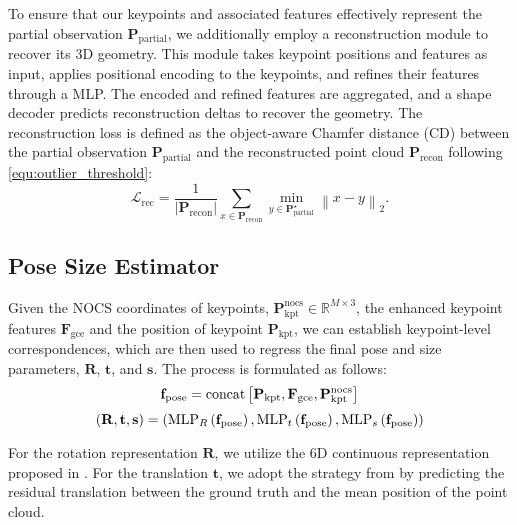 To ensure that our keypoints and associated features effectively represent the partial observation \( \mathbf{P}_{\text{partial}} \), we additionally employ a reconstruction module to recover its 3D geometry. This module takes keypoint positions and features as input, applies positional encoding to the keypoints, and refines their features through a MLP. The encoded and refined features are aggregated, and a shape decoder predicts reconstruction deltas to recover the geometry. The reconstruction loss is defined as the object-aware Chamfer distance (CD) between the partial observation \( \mathbf{P}_{\text{partial}} \) and the reconstructed point cloud \( \mathbf{P}_{\text{recon}} \) following \cref{equ:outlier_threshold}:
\begin{equation}
\mathcal{L}_{\text{rec}}=\frac{1}{\left|\mathbf{P}_{\text{recon}}\right|} \sum_{x \in \mathbf{P}_{\text{recon}}} \min _{y \in \mathbf{P}_{\text{partial}}^{\star}}\left\|x-y\right\|_2 .
\label{equ:loss_rec}
\end{equation}

\subsection{Pose Size Estimator} \label{subsec:pse}
Given the NOCS coordinates of keypoints, \(\mathbf{P}_{\text{kpt}}^{\text{nocs}} \in \mathbb{R}^{M \times 3}\), the enhanced keypoint features \(\mathbf{F}_{\text{gce}}\) and the position of keypoint $\mathbf{P}_{\text{kpt}}$, we can establish keypoint-level correspondences, which are then used to regress the final pose and size parameters, \(\mathbf{R}\), \(\mathbf{t}\), and \(\mathbf{s}\). The process is formulated as follows:
\begin{equation}
\vspace{-0.1cm}
\mathbf{f}_{\text{pose}} = \operatorname{concat} \left[ \mathbf{P}_{\text{kpt}}, \mathbf{F}_{\text{gce}}, \mathbf{P}_{\text{kpt}}^{\text{nocs}} \right]
\end{equation}
\begin{equation}
\small
\left( \mathbf{R}, \mathbf{t}, \mathbf{s} \right) =
\left( \operatorname{MLP}_R \left( \mathbf{f}_{\text{pose}} \right), \operatorname{MLP}_t \left( \mathbf{f}_{\text{pose}} \right), \operatorname{MLP}_s \left( \mathbf{f}_{\text{pose}} \right) \right)
\end{equation}

For the rotation representation \(\mathbf{R}\), we utilize the 6D continuous representation proposed in \cite{Zhou_2019_CVPR}. For the translation \(\mathbf{t}\), we adopt the strategy from \cite{Zheng_2023_CVPR} by predicting the residual translation between the ground truth and the mean position of the point cloud.

